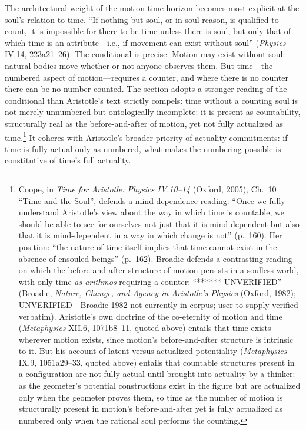 The architectural weight of the motion-time horizon becomes most explicit at the soul's relation to time. ``If nothing but soul, or in soul reason, is qualified to count, it is impossible for there to be time unless there is soul, but only that of which time is an attribute---i.e., if movement can exist without soul'' (\textit{Physics} IV.14, 223a21--26). The conditional is precise. Motion may exist without soul: natural bodies move whether or not anyone observes them. But time---the numbered aspect of motion---requires a counter, and where there is no counter there can be no number counted. The section adopts a stronger reading of the conditional than Aristotle's text strictly compels: time without a counting soul is not merely unnumbered but ontologically incomplete: it is present as countability, structurally real as the before-and-after of motion, yet not fully actualized as time.\footnote{Coope, in \textit{Time for Aristotle: Physics IV.10--14} (Oxford, 2005), Ch.~10 ``Time and the Soul'', defends a mind-dependence reading: ``Once we fully understand Aristotle's view about the way in which time is countable, we should be able to see for ourselves not just that it is mind-dependent but also that it is mind-dependent in a way in which change is not'' (p.~160). Her position: ``the nature of time itself implies that time cannot exist in the absence of ensouled beings'' (p.~162). Broadie defends a contrasting reading on which the before-and-after structure of motion persists in a soulless world, with only time-\textit{as-arithmos} requiring a counter: ``****** UNVERIFIED'' (Broadie, \textit{Nature, Change, and Agency in Aristotle's Physics} (Oxford, 1982); UNVERIFIED---Broadie 1982 not currently in corpus; user to supply verified verbatim). Aristotle's own doctrine of the co-eternity of motion and time (\textit{Metaphysics} XII.6, 1071b8--11, quoted above) entails that time exists wherever motion exists, since motion's before-and-after structure is intrinsic to it. But his account of latent versus actualized potentiality (\textit{Metaphysics} IX.9, 1051a29--33, quoted above) entails that countable structures present in a configuration are not fully actual until brought into actuality by a thinker: as the geometer's potential constructions exist in the figure but are actualized only when the geometer proves them, so time as the number of motion is structurally present in motion's before-and-after yet is fully actualized as numbered only when the rational soul performs the counting.} It coheres with Aristotle's broader priority-of-actuality commitments: if time is fully actual only as numbered, what makes the numbering possible is constitutive of time's full actuality.

